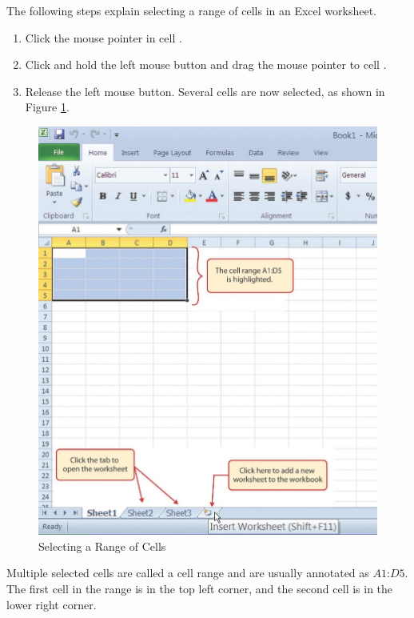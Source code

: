 The following steps explain selecting a range of cells in an Excel worksheet.

\begin{enumbox}
	\begin{enumerate}
		\item Click the mouse pointer in cell .
		\item Click and hold the left mouse button and drag the mouse pointer to cell .
		\item Release the left mouse button. Several cells are now selected, as shown in Figure \ref{01:fig05}.
	\end{enumerate}
\end{enumbox}

\begin{figure}[H]
	\centering
	\includegraphics[width=\maxwidth{.95\linewidth}]{gfx/ch01_fig05}
	\caption{Selecting a Range of Cells}
	\label{01:fig05}
\end{figure}

Multiple selected cells are called a cell range and are usually annotated as $ A1 $:$ D5 $. The first cell in the range is in the top left corner, and the second cell is in the lower right corner.

